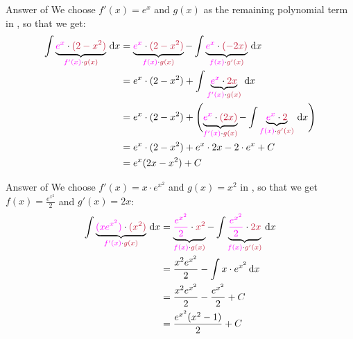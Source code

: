 \documentclass[10pt, aspectratio=1610]{beamer}
\begin{document}
\begin{frame}{Answer of }\label{slide:8}
  We choose $f'(x)=e^{x}$ and $g(x)$ as the remaining polynomial term in ,
  so that we get:
  \begin{align*}
    \int \underbrace{\textcolor[rgb]{1,0,1}{e^{x}}\cdot \textcolor[rgb]{0.77,0.12,0.23}{(2-x^2)}}_{\textcolor[rgb]{1,0,1}{f'(x)}\cdot \textcolor[rgb]{0.77,0.12,0.23}{g(x)}}\,\mathrm{d}x
    &= \underbrace{\textcolor[rgb]{1,0,1}{e^{x}}\cdot \textcolor[rgb]{0.77,0.12,0.23}{(2-x^2)}}_{\textcolor[rgb]{1,0,1}{f(x)}\cdot \textcolor[rgb]{0.77,0.12,0.23}{g(x)}}
    -\int \underbrace{\textcolor[rgb]{1,0,1}{e^{x}}\cdot \textcolor[rgb]{0.77,0.12,0.23}{(-2x)}}_{\textcolor[rgb]{1,0,1}{f(x)}\cdot \textcolor[rgb]{0.77,0.12,0.23}{g'(x)}}\,\mathrm{d}x\\
    &= e^x \cdot (2-x^2) + \int \underbrace{\textcolor[rgb]{1,0,1}{e^{x}}\cdot \textcolor[rgb]{0.77,0.12,0.23}{2x}}_{\textcolor[rgb]{1,0,1}{f'(x)}\cdot \textcolor[rgb]{0.77,0.12,0.23}{g(x)}}\,\mathrm{d}x\\
    &= e^x \cdot (2-x^2) + \Biggl(\underbrace{\textcolor[rgb]{1,0,1}{e^{x}}\cdot \textcolor[rgb]{0.77,0.12,0.23}{(2x)}}_{\textcolor[rgb]{1,0,1}{f'(x)}\cdot \textcolor[rgb]{0.77,0.12,0.23}{g(x)}}
    -\int \underbrace{\textcolor[rgb]{1,0,1}{e^{x}}\cdot \textcolor[rgb]{0.77,0.12,0.23}{2}}_{\textcolor[rgb]{1,0,1}{f(x)}\cdot \textcolor[rgb]{0.77,0.12,0.23}{g'(x)}}\,\mathrm{d}x\Biggr)\\
    &= e^x \cdot (2-x^2) + e^x \cdot 2x - 2 \cdot e^x + C\\
    &= e^x (2x-x^2)+C
  \end{align*}
  \vspace{4pt}
  \hyperlink{slide:6}{}
\end{frame}

\begin{frame}{Answer of }\vspace{4pt}\label{slide:9}
  We choose $f'(x)=x \cdot e^{x^{2}}$ and $g(x)=x^2$ in , 
  so that we get $f(x) = \frac{e^{x^{2}}}{2}$ and $g'(x)= 2x$:
  \begin{align*}
    \int \underbrace{\textcolor[rgb]{1,0,1}{(x e^{x^{2}})}\cdot \textcolor[rgb]{0.77,0.12,0.23}{(x^2)}}_{\textcolor[rgb]{1,0,1}{f'(x)}\cdot \textcolor[rgb]{0.77,0.12,0.23}{g(x)}}\,\mathrm{d}x
    &= \underbrace{\textcolor[rgb]{1,0,1}{\frac{e^{x^{2}}}{2}}\cdot \textcolor[rgb]{0.77,0.12,0.23}{x^2}}_{\textcolor[rgb]{1,0,1}{f(x)}\cdot \textcolor[rgb]{0.77,0.12,0.23}{g(x)}}
    - \int \underbrace{\textcolor[rgb]{1,0,1}{\frac{e^{x^{2}}}{2}}\cdot \textcolor[rgb]{0.77,0.12,0.23}{2x}}_{\textcolor[rgb]{1,0,1}{f(x)}\cdot \textcolor[rgb]{0.77,0.12,0.23}{g'(x)}}\,\mathrm{d}x\\
    &= \frac{x^{2}e^{x^{2}}}{2} - \int x\cdot e^{x^{2}}\,\mathrm{d}x\\
    &= \frac{x^{2}e^{x^{2}}}{2} - \frac{e^{x^{2}}}{2} + C\\
    &= \frac{e^{x^{2}}(x^{2}-1)}{2} + C
  \end{align*}
  \vspace{4pt}
  \hyperlink{slide:6}{}
\end{frame}
\end{document}
